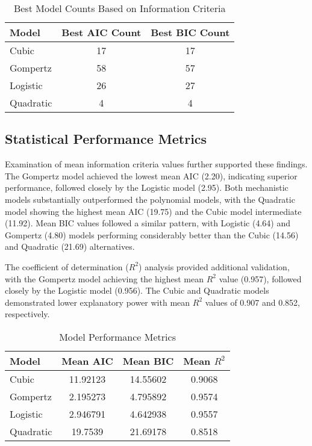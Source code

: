 \documentclass[11pt]{article}
\begin{document}
\begin{table}[h]
    \centering
    \caption{Best Model Counts Based on Information Criteria}
    \begin{tabular}{lcc}
        \toprule
        Model & Best AIC Count & Best BIC Count \\
        \midrule
        Cubic & 17 & 17 \\
        Gompertz & 58 & 57 \\
        Logistic & 26 & 27 \\
        Quadratic & 4 & 4 \\
        \bottomrule
    \end{tabular}
\end{table}

\subsection{Statistical Performance Metrics}
Examination of mean information criteria values further supported these findings. The Gompertz model achieved the lowest mean AIC (2.20), indicating superior performance, followed closely by the Logistic model (2.95). Both mechanistic models substantially outperformed the polynomial models, with the Quadratic model showing the highest mean AIC (19.75) and the Cubic model intermediate (11.92). Mean BIC values followed a similar pattern, with Logistic (4.64) and Gompertz (4.80) models performing considerably better than the Cubic (14.56) and Quadratic (21.69) alternatives.

The coefficient of determination ($R^2$) analysis provided additional validation, with the Gompertz model achieving the highest mean $R^2$ value (0.957), followed closely by the Logistic model (0.956). The Cubic and Quadratic models demonstrated lower explanatory power with mean $R^2$ values of 0.907 and 0.852, respectively.

\begin{table}[h]
    \centering
    \caption{Model Performance Metrics}
    \begin{tabular}{lccc}
        \toprule
        Model & Mean AIC & Mean BIC & Mean $R^2$ \\
        \midrule
        Cubic & 11.92123 & 14.55602 & 0.9068 \\
        Gompertz & 2.195273 & 4.795892 & 0.9574 \\
        Logistic & 2.946791 & 4.642938 & 0.9557 \\
        Quadratic & 19.7539 & 21.69178 & 0.8518 \\
        \bottomrule
    \end{tabular}
\end{table}
\end{document}
